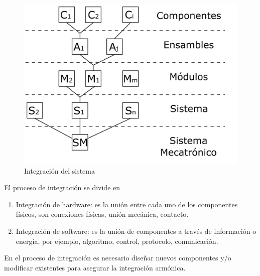 \begin{figure}[h!]
    \centering
        \includegraphics[scale=0.12]{Proyecto Integrador Figuras/26 Integracion del Sistema.png}
        \caption{Integración del sistema}
\end{figure}

El proceso de integración se divide en
\begin{enumerate}
    \item Integración de hardware: es la unión entre cada uno de los componentes físicos, son conexiones físicas, unión mecánica, contacto. 
    
    \item Integración de software: es la unión de componentes a través de información o energía, por ejemplo, algoritmo, control, protocolo, comunicación.
\end{enumerate}

En el proceso de integración es necesario diseñar nuevos componentes y/o modificar existentes para asegurar la integración armónica. 